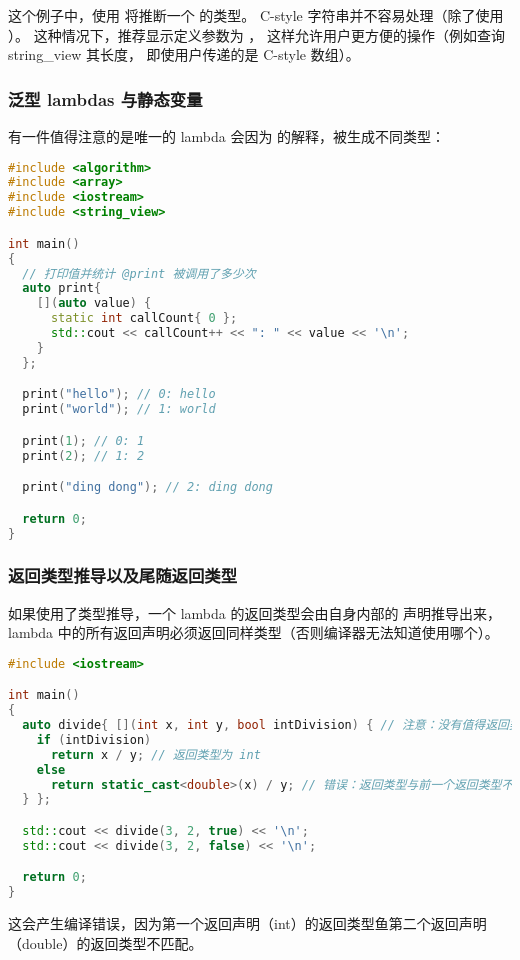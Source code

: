 \documentclass[../../LearnCpp.tex]{subfiles}
\begin{document}
这个例子中，使用  将推断一个  的类型。
C-style 字符串并不容易处理（除了使用 ）。
这种情况下，推荐显示定义参数为 ，
这样允许用户更方便的操作（例如查询 string\_view 其长度，
即使用户传递的是 C-style 数组）。

\subsubsection*{泛型 lambdas 与静态变量}

有一件值得注意的是唯一的 lambda 会因为  的解释，被生成不同类型：

\begin{lstlisting}[language=C++]
#include <algorithm>
#include <array>
#include <iostream>
#include <string_view>

int main()
{
  // 打印值并统计 @print 被调用了多少次
  auto print{
    [](auto value) {
      static int callCount{ 0 };
      std::cout << callCount++ << ": " << value << '\n';
    }
  };

  print("hello"); // 0: hello
  print("world"); // 1: world

  print(1); // 0: 1
  print(2); // 1: 2

  print("ding dong"); // 2: ding dong

  return 0;
}
\end{lstlisting}

\subsubsection*{返回类型推导以及尾随返回类型}

如果使用了类型推导，一个 lambda 的返回类型会由自身内部的  声明推导出来，lambda 中的所有返回声明必须返回同样类型（否则编译器无法知道使用哪个）。

\begin{lstlisting}[language=C++]
#include <iostream>

int main()
{
  auto divide{ [](int x, int y, bool intDivision) { // 注意：没有值得返回类型
    if (intDivision)
      return x / y; // 返回类型为 int
    else
      return static_cast<double>(x) / y; // 错误：返回类型与前一个返回类型不同
  } };

  std::cout << divide(3, 2, true) << '\n';
  std::cout << divide(3, 2, false) << '\n';

  return 0;
}
\end{lstlisting}

这会产生编译错误，因为第一个返回声明（int）的返回类型鱼第二个返回声明（double）的返回类型不匹配。
\end{document}
